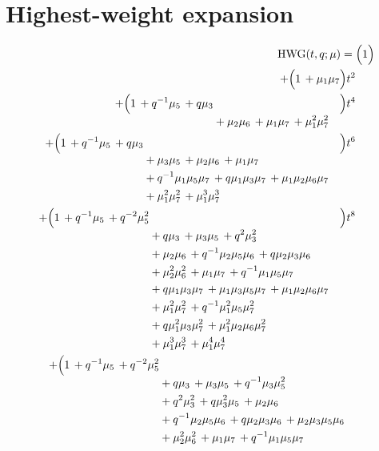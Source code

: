 \documentclass[10pt]{article}
\begin{document}
\section{Highest-weight expansion}
\[
\begin{aligned}
\mathrm{HWG}(t,q;\mu) ={}&
   \Bigl(1\Bigr) \\
  + \Bigl(1\,+\mu_1\mu_7\Bigr)t^{2} \\
  + \Bigl(\begin{aligned}[t]1\,+q^{-1}\mu_5\,+q\mu_3 \\
  &{}+\mu_2\mu_6\,+\mu_1\mu_7\,+\mu_1^{2}\mu_7^{2}\end{aligned}\Bigr)t^{4} \\
  + \Bigl(\begin{aligned}[t]1\,+q^{-1}\mu_5\,+q\mu_3 \\
  &{}+\mu_3\mu_5\,+\mu_2\mu_6\,+\mu_1\mu_7 \\
  &{}+q^{-1}\mu_1\mu_5\mu_7\,+q\mu_1\mu_3\mu_7\,+\mu_1\mu_2\mu_6\mu_7 \\
  &{}+\mu_1^{2}\mu_7^{2}\,+\mu_1^{3}\mu_7^{3}\end{aligned}\Bigr)t^{6} \\
  + \Bigl(\begin{aligned}[t]1\,+q^{-1}\mu_5\,+q^{-2}\mu_5^{2} \\
  &{}+q\mu_3\,+\mu_3\mu_5\,+q^{2}\mu_3^{2} \\
  &{}+\mu_2\mu_6\,+q^{-1}\mu_2\mu_5\mu_6\,+q\mu_2\mu_3\mu_6 \\
  &{}+\mu_2^{2}\mu_6^{2}\,+\mu_1\mu_7\,+q^{-1}\mu_1\mu_5\mu_7 \\
  &{}+q\mu_1\mu_3\mu_7\,+\mu_1\mu_3\mu_5\mu_7\,+\mu_1\mu_2\mu_6\mu_7 \\
  &{}+\mu_1^{2}\mu_7^{2}\,+q^{-1}\mu_1^{2}\mu_5\mu_7^{2} \\
  &{}+q\mu_1^{2}\mu_3\mu_7^{2}\,+\mu_1^{2}\mu_2\mu_6\mu_7^{2} \\
  &{}+\mu_1^{3}\mu_7^{3}\,+\mu_1^{4}\mu_7^{4}\end{aligned}\Bigr)t^{8} \\
  + \Bigl(\begin{aligned}[t]1\,+q^{-1}\mu_5\,+q^{-2}\mu_5^{2} \\
  &{}+q\mu_3\,+\mu_3\mu_5\,+q^{-1}\mu_3\mu_5^{2} \\
  &{}+q^{2}\mu_3^{2}\,+q\mu_3^{2}\mu_5\,+\mu_2\mu_6 \\
  &{}+q^{-1}\mu_2\mu_5\mu_6\,+q\mu_2\mu_3\mu_6\,+\mu_2\mu_3\mu_5\mu_6 \\
  &{}+\mu_2^{2}\mu_6^{2}\,+\mu_1\mu_7\,+q^{-1}\mu_1\mu_5\mu_7 \\

\end{aligned}
\end{aligned}\]
\end{document}
